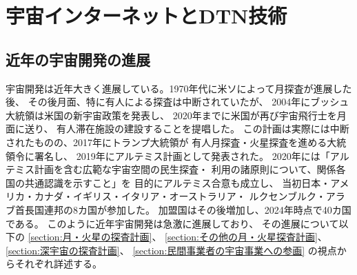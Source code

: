 \chapter{宇宙インターネットとDTN技術}
\label{chap:prerequisite_knowledge}

\section{近年の宇宙開発の進展}
宇宙開発は近年大きく進展している。1970年代に米ソによって月探査が進展した後、
その後月面、特に有人による探査は中断されていたが、
2004年にブッシュ大統領は米国の新宇宙政策を発表し、
2020年までに米国が再び宇宙飛行士を月面に送り、
有人滞在施設の建設することを提唱した。\cite{久保田2009}
この計画は実際には中断されたものの、2017年にトランプ大統領が
有人月探査・火星探査を進める大統領令に署名し、
2019年にアルテミス計画として発表された。\cite{nasa2020}
2020年には「アルテミス計画を含む広範な宇宙空間の民生探査・
利用の諸原則について、関係各国の共通認識を示すこと」を
目的にアルテミス合意\cite{artemis_agreement1}も成立し、
当初日本・アメリカ・カナダ・イギリス・イタリア・オーストラリア・
ルクセンブルク・アラブ首長国連邦の8カ国が参加した。\cite{artemis_agreement2}
加盟国はその後増加し、2024年時点で40カ国である。\cite{artemis_agreement3}
このように近年宇宙開発は急激に進展しており、
その進展について以下の
\ref{section:月・火星の探査計画}、
\ref{section:その他の月・火星探査計画}、
\ref{section:深宇宙の探査計画}、
\ref{section:民間事業者の宇宙事業への参画}
の視点からそれぞれ詳述する。



